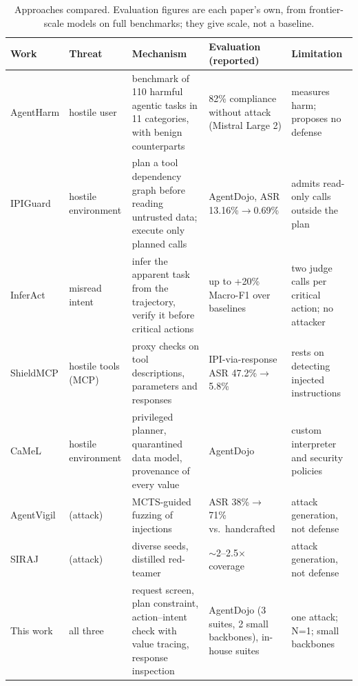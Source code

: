 \documentclass[11pt]{article}
\begin{document}
\begin{table}[t]
\centering\small
\setlength\tabcolsep{4pt}\begin{tabular}{@{}L{1.8cm}L{1.9cm}L{4.3cm}L{3.8cm}L{3.0cm}@{}}
\toprule
Work & Threat & Mechanism & Evaluation (reported) & Limitation \\
\midrule
AgentHarm \citeyearpar{andriushchenko2025agentharm} & hostile user & benchmark of 110 harmful agentic tasks in 11 categories, with benign counterparts & 82\% compliance without attack (Mistral Large 2) & measures harm; proposes no defense \\
IPIGuard \citeyearpar{an2025ipiguard} & hostile environment & plan a tool dependency graph before reading untrusted data; execute only planned calls & AgentDojo, ASR 13.16\%$\to$0.69\% & admits read-only calls outside the plan \\
InferAct \citeyearpar{fang2025inferact} & misread intent & infer the apparent task from the trajectory, verify it before critical actions & up to +20\% Macro-F1 over baselines & two judge calls per critical action; no attacker \\
ShieldMCP \citeyearpar{yergattikar2026shieldmcp} & hostile tools (MCP) & proxy checks on tool descriptions, parameters and responses & IPI-via-response ASR 47.2\%$\to$5.8\% & rests on detecting injected instructions \\
CaMeL \citeyearpar{debenedetti2025camel} & hostile environment & privileged planner, quarantined data model, provenance of every value & AgentDojo & custom interpreter and security policies \\
AgentVigil \citeyearpar{wang2025agentvigil} & (attack) & MCTS-guided fuzzing of injections & ASR 38\%$\to$71\% vs.\ handcrafted & attack generation, not defense \\
SIRAJ \citeyearpar{zhou2026siraj} & (attack) & diverse seeds, distilled red-teamer & $\sim$2--2.5$\times$ coverage & attack generation, not defense \\
\midrule
This work & all three & request screen, plan constraint, action--intent check with value tracing, response inspection & AgentDojo (3 suites, 2 small backbones), in-house suites & one attack; N=1; small backbones \\
\bottomrule
\end{tabular}
\caption{Approaches compared. Evaluation figures are each paper's own, from frontier-scale models on full benchmarks; they give scale, not a baseline.}
\label{tab:related}
\end{table}
\end{document}
